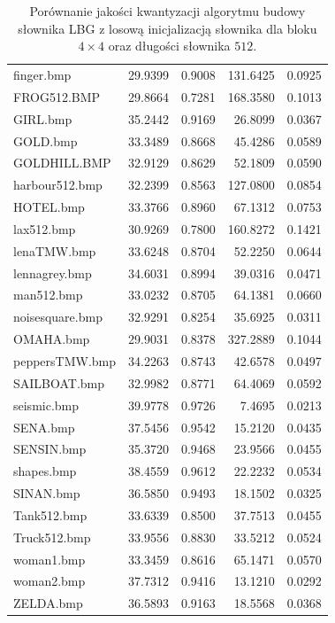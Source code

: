 \documentclass{article}
\begin{document}
\begin{table}[ht]
\begin{tabular}{@{}lrrrr@{}}
finger.bmp         & 29.9399       & 0.9008 & 131.6425 & 0.0925 \\
FROG512.BMP        & 29.8664       & 0.7281 & 168.3580 & 0.1013 \\
GIRL.bmp           & 35.2442       & 0.9169 & 26.8099  & 0.0367 \\
GOLD.bmp           & 33.3489       & 0.8668 & 45.4286  & 0.0589 \\
GOLDHILL.BMP       & 32.9129       & 0.8629 & 52.1809  & 0.0590 \\
harbour512.bmp     & 32.2399       & 0.8563 & 127.0800 & 0.0854 \\
HOTEL.bmp          & 33.3766       & 0.8960 & 67.1312  & 0.0753 \\
lax512.bmp         & 30.9269       & 0.7800 & 160.8272 & 0.1421 \\
lenaTMW.bmp        & 33.6248       & 0.8704 & 52.2250  & 0.0644 \\
lennagrey.bmp      & 34.6031       & 0.8994 & 39.0316  & 0.0471 \\
man512.bmp         & 33.0232       & 0.8705 & 64.1381  & 0.0660 \\
noisesquare.bmp    & 32.9291       & 0.8254 & 35.6925  & 0.0311 \\
OMAHA.bmp          & 29.9031       & 0.8378 & 327.2889 & 0.1044 \\
peppersTMW.bmp     & 34.2263       & 0.8743 & 42.6578  & 0.0497 \\
SAILBOAT.bmp       & 32.9982       & 0.8771 & 64.4069  & 0.0592 \\
seismic.bmp        & 39.9778       & 0.9726 & 7.4695   & 0.0213 \\
SENA.bmp           & 37.5456       & 0.9542 & 15.2120  & 0.0435 \\
SENSIN.bmp         & 35.3720       & 0.9468 & 23.9566  & 0.0455 \\
shapes.bmp         & 38.4559       & 0.9612 & 22.2232  & 0.0534 \\
SINAN.bmp          & 36.5850       & 0.9493 & 18.1502  & 0.0325 \\
Tank512.bmp        & 33.6339       & 0.8500 & 37.7513  & 0.0455 \\
Truck512.bmp       & 33.9556       & 0.8830 & 33.5212  & 0.0524 \\
woman1.bmp         & 33.3459       & 0.8616 & 65.1471  & 0.0570 \\
woman2.bmp         & 37.7312       & 0.9416 & 13.1210  & 0.0292 \\
ZELDA.bmp          & 36.5893       & 0.9163 & 18.5568  & 0.0368 \\ \bottomrule
\end{tabular}
\caption{Porównanie jakości kwantyzacji algorytmu budowy słownika LBG z losową inicjalizacją słownika dla bloku $4 \times 4$ oraz długości słownika $512$.}
\label{tab:lbg_random}
\end{table}
\end{document}
